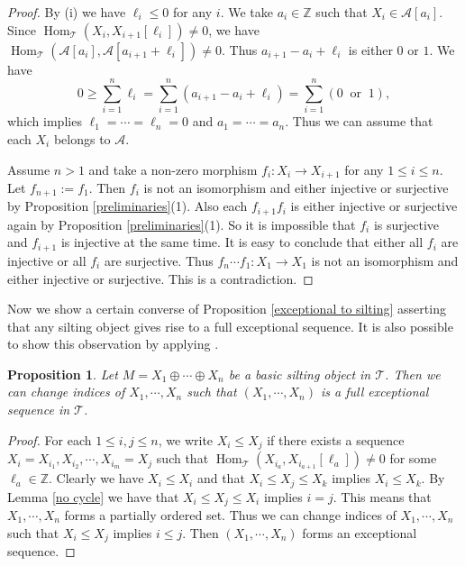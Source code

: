 \documentclass[a4paper,reqno]{amsart}
\newtheorem{proposition}[theorem]{Proposition}
\theoremstyle{definition}
\newcommand{\TT}{{\mathcal T}}
\newcommand{\Z}{\mathbb{Z}}
\newcommand{\Hom}{\operatorname{Hom}\nolimits}
\renewcommand{\AA}{{\mathcal A}}
\begin{document}
\begin{proof}
By (i) we have $\ell_i\le0$ for any $i$.
We take $a_i\in\Z$ such that $X_i\in\AA[a_i]$.
Since $\Hom_{\TT}(X_i,X_{i+1}[\ell_i])\neq0$, we have
$\Hom_{\TT}(\AA[a_i],\AA[a_{i+1}+\ell_i])\neq0$.
Thus $a_{i+1}-a_i+\ell_i$ is either $0$ or $1$. We have
\[0\ge \sum_{i=1}^n\ell_i=\sum_{i=1}^n(a_{i+1}-a_i+\ell_i)
=\sum_{i=1}^n(0\ \mbox{ or }\ 1),\]
which implies $\ell_1=\cdots=\ell_n=0$ and $a_1=\cdots=a_n$.
Thus we can assume that each $X_i$ belongs to $\AA$.

Assume $n>1$ and take a non-zero morphism $f_i:X_i\to X_{i+1}$ for any $1\le i\le n$.
Let $f_{n+1}:=f_1$. Then $f_i$ is not an isomorphism and either injective or surjective
by Proposition \ref{preliminaries}(1).
Also each $f_{i+1}f_i$ is either injective or surjective again by Proposition \ref{preliminaries}(1).
So it is impossible that $f_i$ is surjective and $f_{i+1}$ is injective at the same time.
It is easy to conclude that either all $f_i$ are injective or all $f_i$ are surjective.
Thus $f_n\cdots f_1:X_1\to X_1$ is not an isomorphism and either injective or surjective.
This is a contradiction.
\end{proof}

Now we show a certain converse of Proposition \ref{exceptional to silting}
asserting that any silting object gives rise to a full exceptional sequence.
It is also possible to show this observation by applying \cite[Theorem A]{AST}.

\begin{proposition}\label{silting to exceptional}
Let $M=X_1\oplus\cdots\oplus X_n$ be a basic silting object in $\TT$.
Then we can change indices of $X_1,\cdots,X_n$ such that
$(X_1,\cdots,X_n)$ is a full exceptional sequence in $\TT$.
\end{proposition}

\begin{proof}
For each $1\le i,j\le n$, we write $X_i\le X_j$ if there exists a sequence
$X_i=X_{i_1},X_{i_2},\cdots,X_{i_m}=X_j$ such that
$\Hom_{\TT}(X_{i_a},X_{i_{a+1}}[\ell_a])\neq0$ for some $\ell_a\in\Z$.
Clearly we have $X_i\le X_i$ and that $X_i\le X_j\le X_k$ implies $X_i\le X_k$.
By Lemma \ref{no cycle} we have that $X_i\le X_j\le X_i$ implies $i=j$.
This means that $X_1,\cdots,X_n$ forms a partially ordered set.
Thus we can change indices of $X_1,\cdots,X_n$ such that $X_i\le X_j$ implies $i\le j$.
Then $(X_1,\cdots,X_n)$ forms an exceptional sequence.
\end{proof}
\end{document}

